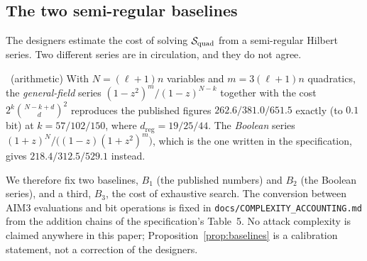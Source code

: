 \subsection{The two semi-regular baselines}

The designers estimate the cost of solving $\mathcal{S}_{\mathrm{quad}}$ from a semi-regular Hilbert series. Two different
series are in circulation, and they do not agree.
\begin{proposition}\label{prop:baselines}
\Proved\ (arithmetic) With $N=(\ell+1)n$ variables and $m=3(\ell+1)n$ quadratics, the
\emph{general-field} series $(1-z^2)^m/(1-z)^{N-k}$ together with the cost
$2^k\binom{N-k+d}{d}^2$ reproduces the published figures $262.6/381.0/651.5$ exactly (to $0.1$ bit)
at $k=57/102/150$, where $d_{\mathrm{reg}}=19/25/44$. The \emph{Boolean} series
$(1+z)^N/\bigl((1-z)(1+z^2)^m\bigr)$, which is the one written in the specification, gives
$218.4/312.5/529.1$ instead.
\end{proposition}

We therefore fix two baselines, $B_1$ (the published numbers) and $B_2$ (the Boolean series), and a
third, $B_3$, the cost of exhaustive search. The conversion between AIM3 evaluations and bit
operations is fixed in \texttt{docs/COMPLEXITY\_ACCOUNTING.md} from the addition chains of the
specification's Table~5. No attack complexity is claimed anywhere in this paper;
Proposition~\ref{prop:baselines} is a calibration statement, not a correction of the designers.
